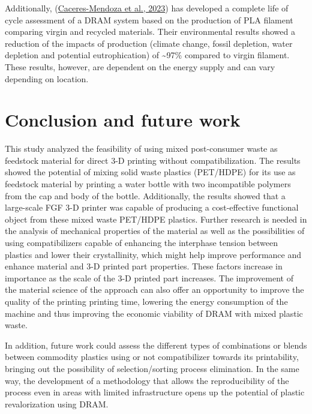 \documentclass[
  12pt,
  number,
  review]{elsarticle}
\begin{document}
Additionally,
(\protect\hyperlink{ref-caceres-mendoza2023}{Caceres-Mendoza et al.,
2023}) has developed a complete life of cycle assessment of a DRAM
system based on the production of PLA filament comparing virgin and
recycled materials. Their environmental results showed a reduction of
the impacts of production (climate change, fossil depletion, water
depletion and potential eutrophication) of \textasciitilde97\% compared
to virgin filament. These results, however, are dependent on the energy
supply and can vary depending on location.

\hypertarget{conclusion-and-future-work}{%
\section{Conclusion and future work}\label{conclusion-and-future-work}}

This study analyzed the feasibility of using mixed post-consumer waste
as feedstock material for direct 3-D printing without compatibilization.
The results showed the potential of mixing solid waste plastics
(PET/HDPE) for its use as feedstock material by printing a water bottle
with two incompatible polymers from the cap and body of the bottle.
Additionally, the results showed that a large-scale FGF 3-D printer was
capable of producing a cost-effective functional object from these mixed
waste PET/HDPE plastics. Further research is needed in the analysis of
mechanical properties of the material as well as the possibilities of
using compatibilizers capable of enhancing the interphase tension
between plastics and lower their crystallinity, which might help improve
performance and enhance material and 3-D printed part properties. These
factors increase in importance as the scale of the 3-D printed part
increases. The improvement of the material science of the approach can
also offer an opportunity to improve the quality of the printing
printing time, lowering the energy consumption of the machine and thus
improving the economic viability of DRAM with mixed plastic waste.

In addition, future work could assess the different types of
combinations or blends between commodity plastics using or not
compatibilizer towards its printability, bringing out the possibility of
selection/sorting process elimination. In the same way, the development
of a methodology that allows the reproducibility of the process even in
areas with limited infrastructure opens up the potential of plastic
revalorization using DRAM.
\end{document}
